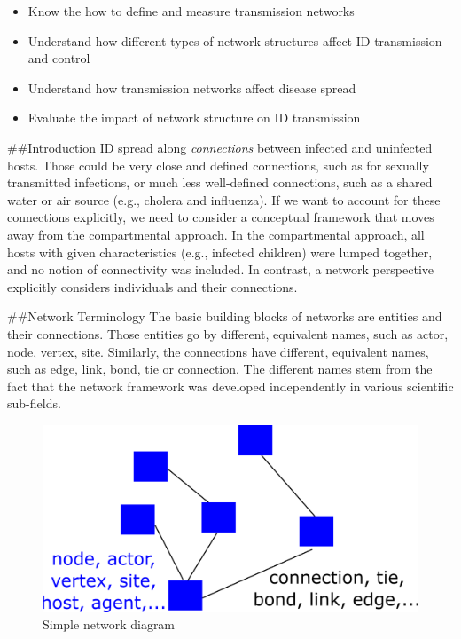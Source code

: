 \documentclass[]{book}
\providecommand{\tightlist}{%
  \setlength{\itemsep}{0pt}\setlength{\parskip}{0pt}}
\theoremstyle{definition}
\theoremstyle{definition}
\theoremstyle{definition}
\theoremstyle{remark}
\begin{document}
\begin{itemize}
\tightlist
\item
  Know the how to define and measure transmission networks
\item
  Understand how different types of network structures affect ID
  transmission and control
\item
  Understand how transmission networks affect disease spread
\item
  Evaluate the impact of network structure on ID transmission
\end{itemize}

\#\#Introduction ID spread along \emph{connections} between infected and
uninfected hosts. Those could be very close and defined connections,
such as for sexually transmitted infections, or much less well-defined
connections, such as a shared water or air source (e.g., cholera and
influenza). If we want to account for these connections explicitly, we
need to consider a conceptual framework that moves away from the
compartmental approach. In the compartmental approach, all hosts with
given characteristics (e.g., infected children) were lumped together,
and no notion of connectivity was included. In contrast, a network
perspective explicitly considers individuals and their connections.

\#\#Network Terminology The basic building blocks of networks are
entities and their connections. Those entities go by different,
equivalent names, such as actor, node, vertex, site. Similarly, the
connections have different, equivalent names, such as edge, link, bond,
tie or connection. The different names stem from the fact that the
network framework was developed independently in various scientific
sub-fields.

\begin{figure}
\centering
\includegraphics{./images/network-diagram.png}
\caption{Simple network diagram}
\end{figure}
\end{document}
